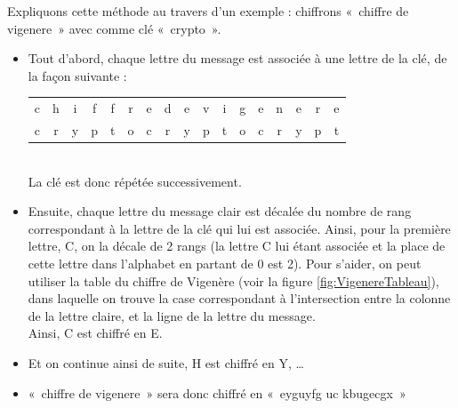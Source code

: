 Expliquons cette méthode au travers d'un exemple : chiffrons «~chiffre
de vigenere~» avec comme clé «~crypto~».
\begin{itemize}
  \item Tout d'abord, chaque lettre du message est associée à une
    lettre de la clé, de la façon suivante : \\
    \begin{tabular}{c@{}c@{}c@{}c@{}c@{}c@{}cc@{}cc@{}c@{}c@{}c@{}c@{}c@{}c@{}c}
      c & h & i & f & f & r & e &
      d & e &
      v & i & g & e & n & e & r & e \\

      c & r & y & p & t & o & c & 
      r & y & 
      p & t & o & c & r & y & p & t \\
    \end{tabular}\\
    La clé est donc répétée successivement.
  \item Ensuite, chaque lettre du message clair est décalée du nombre
    de rang correspondant à la lettre de la clé qui lui est
    associée. Ainsi, pour la première lettre, C, on la décale de 2
    rangs (la lettre C lui étant associée et la place de cette lettre
    dans l'alphabet en partant de 0 est 2). Pour s'aider, on peut
    utiliser la table du chiffre de Vigenère (voir la figure
    \ref{fig:VigenereTableau}), dans laquelle on trouve la case
correspondant à l'intersection entre la colonne de la lettre
claire, et la ligne de la lettre du message. \\
    Ainsi, C est chiffré en E.
  \item Et on continue ainsi de suite, H est chiffré en Y, \dots
  \item «~chiffre de vigenere~» sera donc chiffré en «~eyguyfg uc
    kbugecgx~»
\end{itemize}

